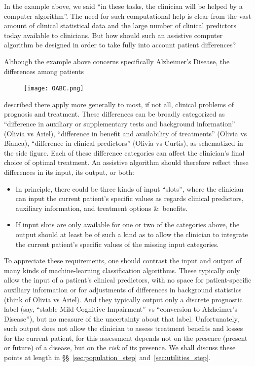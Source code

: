 \documentclass[utf8]{FrontiersinHarvard} %
\newcommand*{\pencil}{{\fontencoding{U}\fontfamily{fontawesometwo}\selectfont\symbol{210}}}
\newcommand{\mynotep}[1]{{\color{notecolour}\pencil\ #1}}
\newcommand*{\amp}{\&}
\newcommand*{\sects}{\S\S}%
\renewcommand*{\|}[1][]{\nonscript\:#1\vert\nonscript\:\mathopen{}}
\newcommand*{\ad}{Alzheimer's Disease}
\newcommand*{\mci}{Mild Cognitive Impairment}
\begin{document}
In the example above, we said \enquote{in these tasks, the clinician will be helped by a computer algorithm}. The need for such computational help is clear from the vast amount of clinical statistical data and the large number of clinical predictors today available to clinicians. But how should such an assistive computer algorithm be designed in order to take fully into account patient differences?

Although the example above concerns specifically \ad, the differences among patients
\begin{figure}%
\vspace{-1.5em}%
\texttt{[image: OABC.png]}%
\vspace{-2em}%
\end{figure}
described there apply more generally to most, if not all, clinical problems of prognosis and treatment. These differences can be broadly categorized as \enquote{difference in auxiliary or supplementary tests  and background information} (Olivia vs Ariel), \enquote{difference in benefit and availability of treatments} (Olivia vs Bianca), \enquote{difference in clinical predictors} (Olivia vs Curtis), as schematized in the side figure. Each of these difference categories can affect the clinician's final choice of optimal treatment. An assistive algorithm should therefore reflect these differences in its input, its output, or both:
\begin{itemize}
\item In principle, there could be three kinds of input \enquote{slots}, where the clinician can input the current patient's specific values as regards clinical predictors, auxiliary information, and treatment options \amp\ benefits.
\item If input slots are only available for one or two of the categories above, the output should at least be of such a kind as to allow the clinician to integrate the current patient's specific values of the missing input categories.
\end{itemize}

To appreciate these requirements, one should contrast the input and output of many kinds of machine-learning classification algorithms. These typically only allow the input of a patient's clinical predictors, with no space for patient-specific auxiliary information or for adjustments of differences in background statistics (think of Olivia vs Ariel). And they typically output only a discrete prognostic label (say, \enquote{stable \mci} vs \enquote{conversion to \ad}), but no measure of the uncertainty about that label. Unfortunately, such output does not allow the clinician to assess treatment benefits and losses for the current patient, for this assessment depends not on the presence (present or future) of a disease, but on the \emph{risk} of its presence. We shall discuss these points at length in \sects~\ref{sec:population_step} and~\ref{sec:utilities_step}.
\end{document}
